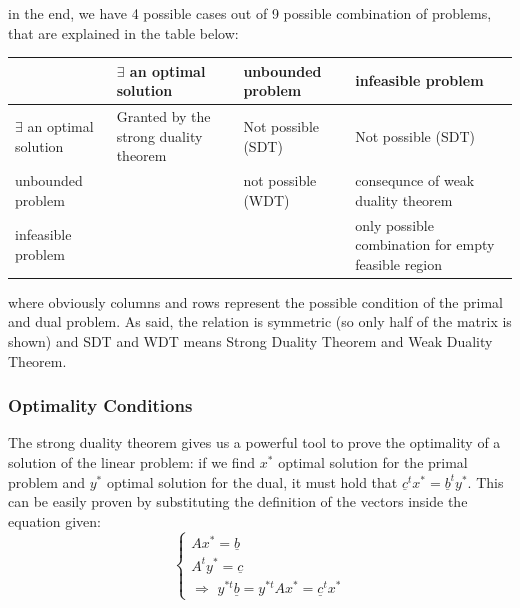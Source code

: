             in the end, we have 4 possible cases out of 9 possible combination of problems, that are explained in the table below:
            \begin{center}
                \begin{tabular}{ m{2.5cm} || m{4cm} | m{4cm} | m{4cm} | }
                    & $\exists$ an optimal solution & unbounded problem & infeasible problem \\
                    \hline
                    \hline
                    $\exists$ an optimal solution & Granted by the strong duality theorem & Not possible (SDT) & Not possible (SDT) \\
                    \hline
                    unbounded problem &  & not possible (WDT) & consequnce of weak duality theorem \\
                    \hline
                    infeasible problem &  &  & only possible combination for empty feasible region\\
                    \hline
                \end{tabular}
            \end{center}
            where obviously columns and rows represent the possible condition of the primal and dual problem. As said, the relation is symmetric (so only half of the matrix is shown) and SDT and WDT means Strong Duality Theorem and Weak Duality Theorem.

        \subsubsection{Optimality Conditions}
            The strong duality theorem gives us a powerful tool to prove the optimality of a solution of the linear problem: if we find $x^*$ optimal solution for the primal problem and $y^*$ optimal solution for the dual, it must hold that $\underline{c}^tx^* = \underline{b}^ty^*$. This can be easily proven by substituting the definition of the vectors inside the equation given:
            \begin{equation}
                \begin{cases}
                    Ax^* = \underline{b} \\
                    A^ty^* = \underline{c} \\
                    \Rightarrow \,\, y^{*t} \underline{b} = y^{*t}Ax^* = \underline{c}^tx^*
                \end{cases}
            \end{equation}

